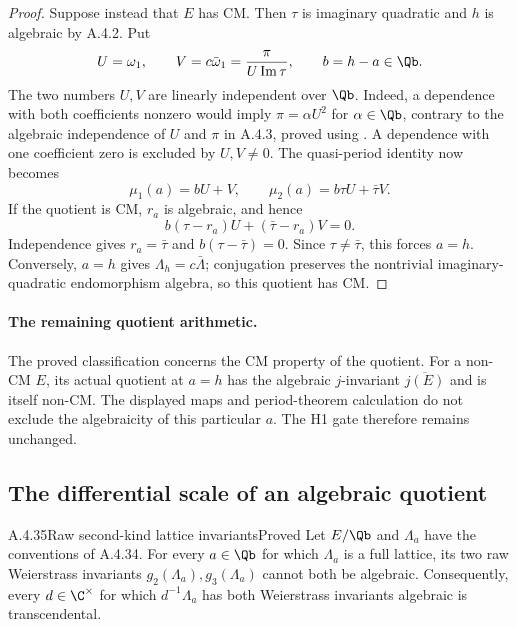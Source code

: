 \begin{proof}
Suppose instead that $E$ has CM. Then $\tau$ is imaginary quadratic
and $h$ is algebraic by A.4.2. Put
\[
 U=\omega_1,\qquad
 V=c\bar\omega_1=\frac{\pi}{U\operatorname{Im}\tau},\qquad
 b=h-a\in\Qb.
\]
The two numbers $U,V$ are linearly independent over $\Qb$.
Indeed, a dependence with both coefficients nonzero would imply
$\pi=\alpha U^2$ for $\alpha\in\Qb$, contrary to the algebraic
independence of $U$ and $\pi$ in A.4.3, proved using
\cite[Corollary 2, p.343]{EllChudnovsky1978}.
A dependence with one coefficient zero is excluded by $U,V\ne0$.
The quasi-period identity now becomes
\[
 \mu_1(a)=bU+V,\qquad
 \mu_2(a)=b\tau U+\bar\tau V.
\]
If the quotient is CM, $r_a$ is algebraic, and hence
\[
 b(\tau-r_a)U+(\bar\tau-r_a)V=0.
\]
Independence gives $r_a=\bar\tau$ and
$b(\tau-\bar\tau)=0$. Since $\tau\ne\bar\tau$, this forces
$a=h$. Conversely, $a=h$ gives $\Lambda_h=c\bar\Lambda$;
conjugation preserves the nontrivial imaginary-quadratic
endomorphism algebra, so this quotient has CM.
\end{proof}

\paragraph{The remaining quotient arithmetic.}
The proved classification concerns the CM property of the quotient.
For a non-CM $E$, its actual quotient at $a=h$ has the algebraic
$j$-invariant $\overline{j(E)}$ and is itself non-CM. The displayed
maps and period-theorem calculation do not exclude the algebraicity
of this particular $a$. The H1 gate therefore remains unchanged.

\subsection{The differential scale of an algebraic quotient}

\begin{result}{A.4.35}{Raw second-kind lattice invariants}{Proved}
Let $E/\Qb$ and $\Lambda_a$ have the conventions of A.4.34.
For every $a\in\Qb$ for which $\Lambda_a$ is a full lattice, its two
raw Weierstrass invariants $g_2(\Lambda_a),g_3(\Lambda_a)$ cannot
both be algebraic. Consequently, every $d\in\C^\times$ for which
$d^{-1}\Lambda_a$ has both Weierstrass invariants algebraic is
transcendental.
\end{result}


